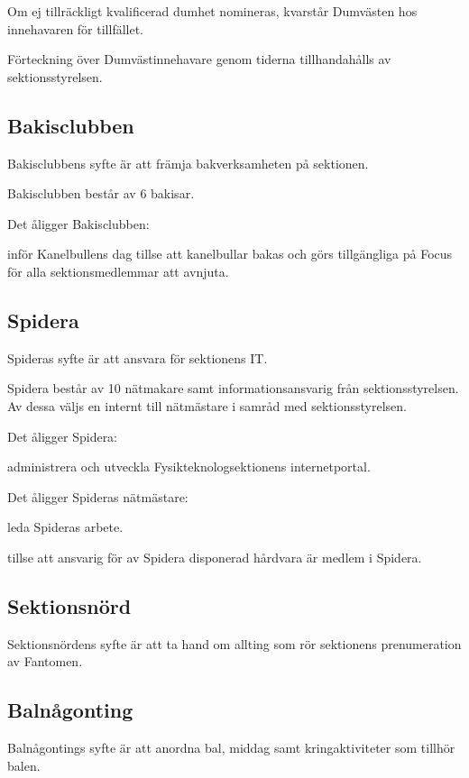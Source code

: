 \documentclass{styrdokument}
\begin{document}
\? Om ej tillräckligt kvalificerad dumhet nomineras, kvarstår Dumvästen hos innehavaren för tillfället.
		
\? Förteckning över Dumvästinnehavare genom tiderna tillhandahålls av sektionsstyrelsen.

\subsection{Bakisclubben}
\? Bakisclubbens syfte är att främja bakverksamheten på sektionen.

\? Bakisclubben består av 6 bakisar.

\? Det åligger Bakisclubben:
\begin{aligganden}
    \item inför Kanelbullens dag tillse att kanelbullar bakas och görs tillgängliga på Focus för alla sektionsmedlemmar att avnjuta.
\end{aligganden}

\subsection{Spidera}
\? Spideras syfte är att ansvara för sektionens IT.

\? Spidera består av 10 nätmakare samt informationsansvarig från sektionsstyrelsen.
Av dessa väljs en internt till nätmästare i samråd med sektionsstyrelsen.

\? Det åligger Spidera:
\begin{aligganden}
    \item administrera och utveckla Fysikteknologsektionens internetportal.
\end{aligganden}

\? Det åligger Spideras nätmästare:
\begin{aligganden}
	\item leda Spideras arbete.
    \item tillse att ansvarig för av Spidera disponerad hårdvara är medlem i Spidera.
\end{aligganden}

\subsection{Sektionsnörd}
\? Sektionsnördens syfte är att ta hand om allting som rör sektionens prenumeration av Fantomen.

\subsection{Balnågonting}
\? Balnågontings syfte är att anordna bal, middag samt kringaktiviteter som tillhör balen.
\end{document}
